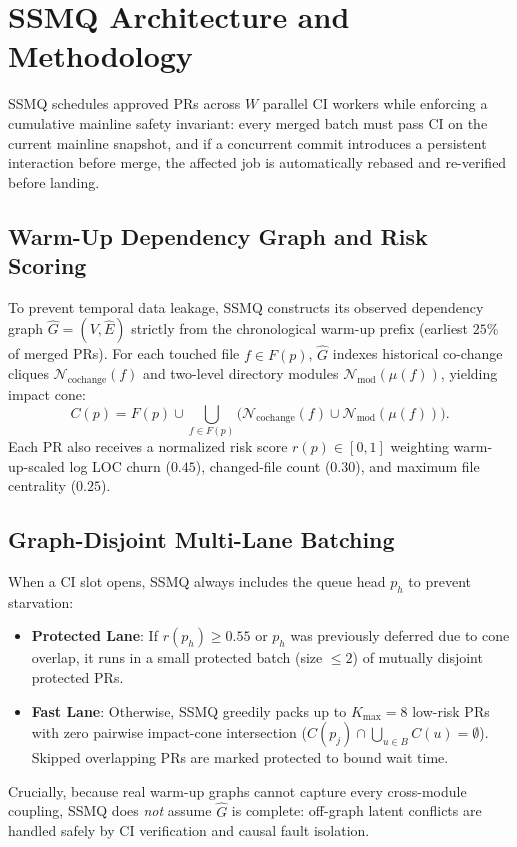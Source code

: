 \section{SSMQ Architecture and Methodology}
\label{sec:methodology}

SSMQ schedules approved PRs across $W$ parallel CI workers while enforcing a cumulative mainline safety invariant: every merged batch must pass CI on the current mainline snapshot, and if a concurrent commit introduces a persistent interaction before merge, the affected job is automatically rebased and re-verified before landing.

\subsection{Warm-Up Dependency Graph and Risk Scoring}
To prevent temporal data leakage, SSMQ constructs its observed dependency graph $\hat{G}=(V,\hat{E})$ strictly from the chronological warm-up prefix (earliest $25\%$ of merged PRs). For each touched file $f \in F(p)$, $\hat{G}$ indexes historical co-change cliques $\mathcal{N}_{\text{cochange}}(f)$ and two-level directory modules $\mathcal{N}_{\text{mod}}(\mu(f))$, yielding impact cone:
\begin{equation}
C(p) = F(p) \cup \bigcup_{f \in F(p)} \big( \mathcal{N}_{\text{cochange}}(f) \cup \mathcal{N}_{\text{mod}}(\mu(f)) \big).
\end{equation}
Each PR also receives a normalized risk score $r(p) \in [0, 1]$ weighting warm-up-scaled log LOC churn ($0.45$), changed-file count ($0.30$), and maximum file centrality ($0.25$).

\subsection{Graph-Disjoint Multi-Lane Batching}
When a CI slot opens, SSMQ always includes the queue head $p_h$ to prevent starvation:
\begin{itemize}
    \item \textbf{Protected Lane}: If $r(p_h) \ge 0.55$ or $p_h$ was previously deferred due to cone overlap, it runs in a small protected batch (size $\le 2$) of mutually disjoint protected PRs.
    \item \textbf{Fast Lane}: Otherwise, SSMQ greedily packs up to $K_{\max}=8$ low-risk PRs with zero pairwise impact-cone intersection ($C(p_j) \cap \bigcup_{u \in B} C(u) = \emptyset$). Skipped overlapping PRs are marked protected to bound wait time.
\end{itemize}
Crucially, because real warm-up graphs cannot capture every cross-module coupling, SSMQ does \emph{not} assume $\hat{G}$ is complete: off-graph latent conflicts are handled safely by CI verification and causal fault isolation.

